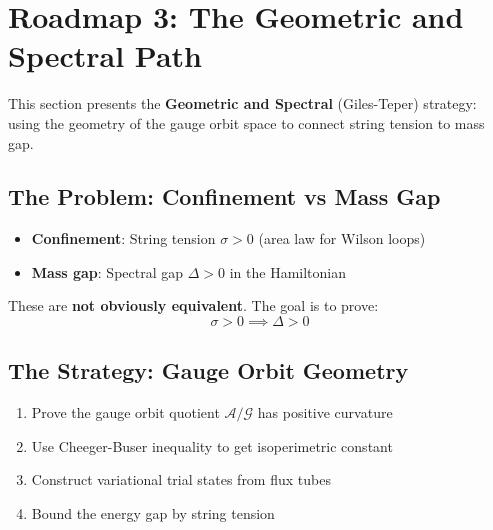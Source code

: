 \section{Roadmap 3: The Geometric and Spectral Path}
\label{sec:roadmap-geometric-spectral}

This section presents the \textbf{Geometric and Spectral} (Giles-Teper) strategy: 
using the geometry of the gauge orbit space to connect string tension to mass gap.

\subsection{The Problem: Confinement vs Mass Gap}

\begin{problem}
\begin{itemize}
\item \textbf{Confinement}: String tension $\sigma > 0$ (area law for Wilson loops)
\item \textbf{Mass gap}: Spectral gap $\Delta > 0$ in the Hamiltonian
\end{itemize}
These are \textbf{not obviously equivalent}. The goal is to prove:
\begin{equation}
\sigma > 0 \implies \Delta > 0
\end{equation}
\end{problem}

\subsection{The Strategy: Gauge Orbit Geometry}

\begin{strategy}
\begin{enumerate}
\item Prove the gauge orbit quotient $\mathcal{A}/\mathcal{G}$ has positive curvature
\item Use Cheeger-Buser inequality to get isoperimetric constant
\item Construct variational trial states from flux tubes
\item Bound the energy gap by string tension
\end{enumerate}
\end{strategy}

